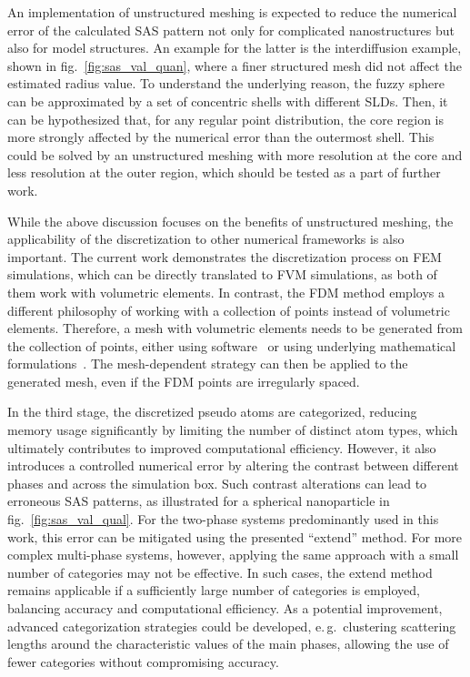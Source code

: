 \documentclass[preprint, 5p, times, twocolumn]{elsarticle}
\begin{document}
An implementation of unstructured meshing is expected to reduce the numerical error of the calculated SAS pattern not only for complicated nanostructures but also for model structures. An example for the latter is the interdiffusion example, shown in fig.~\ref{fig:sas_val_quan}, where a finer structured mesh did not affect the estimated radius value. To understand the underlying reason, the fuzzy sphere can be approximated by a set of concentric shells with different SLDs. Then, it can be hypothesized that, for any regular point distribution, the core region is more strongly affected by the numerical error than the outermost shell. This could be solved by an unstructured meshing with more resolution at the core and less resolution at the outer region, which should be tested as a part of further work.

While the above discussion focuses on the benefits of unstructured meshing, the applicability of the discretization to other numerical frameworks is also important. The current work demonstrates the discretization process on FEM simulations, which can be directly translated to FVM simulations, as both of them work with volumetric elements. In contrast, the FDM method employs a different philosophy of working with a collection of points instead of volumetric elements. Therefore, a mesh with volumetric elements needs to be generated from the collection of points, either using software~\cite{callieri2012meshlab} or using underlying mathematical formulations~\cite{delaunay1934sur, bernardini1999ball, kazhdan2013screened}. The mesh-dependent strategy can then be applied to the generated mesh, even if the FDM points are irregularly spaced.

In the third stage, the discretized pseudo atoms are categorized, reducing memory usage significantly by limiting the number of distinct atom types, which ultimately contributes to improved computational efficiency. However, it also introduces a controlled numerical error by altering the contrast between different phases and across the simulation box. Such contrast alterations can lead to erroneous SAS patterns, as illustrated for a spherical nanoparticle in fig.~\ref{fig:sas_val_qual}. For the two-phase systems predominantly used in this work, this error can be mitigated using the presented “extend” method. For more complex multi-phase systems, however, applying the same approach with a small number of categories may not be effective. In such cases, the extend method remains applicable if a sufficiently large number of categories is employed, balancing accuracy and computational efficiency. As a potential improvement, advanced categorization strategies could be developed, e.\,g.\ clustering scattering lengths around the characteristic values of the main phases, allowing the use of fewer categories without compromising accuracy.
\end{document}
